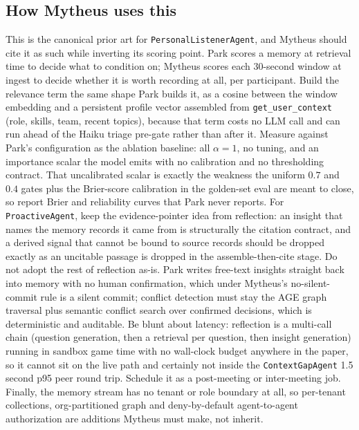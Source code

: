 \subsection{How Mytheus uses this}
\begin{takeaway}
This is the canonical prior art for \texttt{PersonalListenerAgent}, and Mytheus should cite it as such while inverting its scoring point. Park scores a memory at retrieval time to decide what to condition on; Mytheus scores each 30-second window at ingest to decide whether it is worth recording at all, per participant. Build the relevance term the same shape Park builds it, as a cosine between the window embedding and a persistent profile vector assembled from \texttt{get\_user\_context} (role, skills, team, recent topics), because that term costs no LLM call and can run ahead of the Haiku triage pre-gate rather than after it. Measure against Park's configuration as the ablation baseline: all $\alpha=1$, no tuning, and an importance scalar the model emits with no calibration and no thresholding contract. That uncalibrated scalar is exactly the weakness the uniform $0.7$ and $0.4$ gates plus the Brier-score calibration in the golden-set eval are meant to close, so report Brier and reliability curves that Park never reports. For \texttt{ProactiveAgent}, keep the evidence-pointer idea from reflection: an insight that names the memory records it came from is structurally the citation contract, and a derived signal that cannot be bound to source records should be dropped exactly as an uncitable passage is dropped in the assemble-then-cite stage. Do not adopt the rest of reflection as-is. Park writes free-text insights straight back into memory with no human confirmation, which under Mytheus's no-silent-commit rule is a silent commit; conflict detection must stay the AGE graph traversal plus semantic conflict search over confirmed decisions, which is deterministic and auditable. Be blunt about latency: reflection is a multi-call chain (question generation, then a retrieval per question, then insight generation) running in sandbox game time with no wall-clock budget anywhere in the paper, so it cannot sit on the live path and certainly not inside the \texttt{ContextGapAgent} 1.5 second p95 peer round trip. Schedule it as a post-meeting or inter-meeting job. Finally, the memory stream has no tenant or role boundary at all, so per-tenant collections, org-partitioned graph and deny-by-default agent-to-agent authorization are additions Mytheus must make, not inherit.
\end{takeaway}

